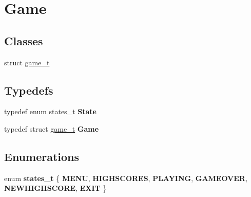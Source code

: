 \hypertarget{group__Game}{}\section{Game}
\label{group__Game}
\subsection*{Classes}
\begin{DoxyCompactItemize}
\item 
struct \hyperlink{structgame__t}{game\+\_\+t}
\end{DoxyCompactItemize}
\subsection*{Typedefs}
\begin{DoxyCompactItemize}
\item 
\mbox{\label{group__Game_gad8e0261f75c7848aefd976b15dd70750}} 
typedef enum states\+\_\+t {\bfseries State}
\item 
\mbox{\label{group__Game_ga60bc4fc9f003fda638c2cd77d08f530b}} 
typedef struct \hyperlink{structgame__t}{game\+\_\+t} {\bfseries Game}
\end{DoxyCompactItemize}
\subsection*{Enumerations}
\begin{DoxyCompactItemize}
\item 
\mbox{\label{group__Game_gae4bcd51a032844028300b600d585d021}} 
enum {\bfseries states\+\_\+t} \{ \newline
{\bfseries M\+E\+NU}, 
{\bfseries H\+I\+G\+H\+S\+C\+O\+R\+ES}, 
{\bfseries P\+L\+A\+Y\+I\+NG}, 
{\bfseries G\+A\+M\+E\+O\+V\+ER}, 
\newline
{\bfseries N\+E\+W\+H\+I\+G\+H\+S\+C\+O\+RE}, 
{\bfseries E\+X\+IT}
 \}
\end{DoxyCompactItemize}

